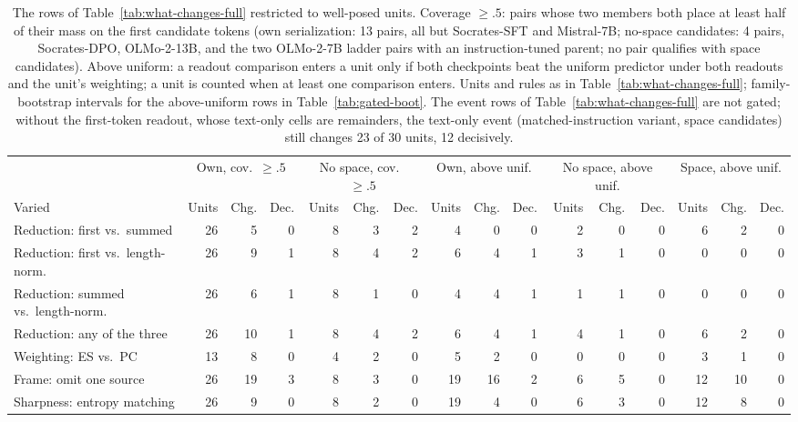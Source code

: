 \begin{table}[t]
\centering\scriptsize
\setlength{\tabcolsep}{2.4pt}
\begin{tabular}{@{}lrrr@{\hspace{5pt}}rrr@{\hspace{5pt}}rrr@{\hspace{5pt}}rrr@{\hspace{5pt}}rrr@{}}
\toprule
& \multicolumn{3}{c}{Own, cov.\ $\ge.5$} & \multicolumn{3}{c}{No space, cov.\ $\ge.5$} & \multicolumn{3}{c}{Own, above unif.} & \multicolumn{3}{c}{No space, above unif.} & \multicolumn{3}{c}{Space, above unif.} \\
\cmidrule(lr){2-4}\cmidrule(lr){5-7}\cmidrule(lr){8-10}\cmidrule(lr){11-13}\cmidrule(l){14-16}
Varied & Units & Chg. & Dec. & Units & Chg. & Dec. & Units & Chg. & Dec. & Units & Chg. & Dec. & Units & Chg. & Dec. \\
\midrule
Reduction: first vs.\ summed & 26 & 5 & 0 & 8 & 3 & 2 & 4 & 0 & 0 & 2 & 0 & 0 & 6 & 2 & 0 \\
Reduction: first vs.\ length-norm. & 26 & 9 & 1 & 8 & 4 & 2 & 6 & 4 & 1 & 3 & 1 & 0 & 0 & 0 & 0 \\
Reduction: summed vs.\ length-norm. & 26 & 6 & 1 & 8 & 1 & 0 & 4 & 4 & 1 & 1 & 1 & 0 & 0 & 0 & 0 \\
Reduction: any of the three & 26 & 10 & 1 & 8 & 4 & 2 & 6 & 4 & 1 & 4 & 1 & 0 & 6 & 2 & 0 \\
Weighting: ES vs.\ PC & 13 & 8 & 0 & 4 & 2 & 0 & 5 & 2 & 0 & 0 & 0 & 0 & 3 & 1 & 0 \\
Frame: omit one source & 26 & 19 & 3 & 8 & 3 & 0 & 19 & 16 & 2 & 6 & 5 & 0 & 12 & 10 & 0 \\
Sharpness: entropy matching & 26 & 9 & 0 & 8 & 2 & 0 & 19 & 4 & 0 & 6 & 3 & 0 & 12 & 8 & 0 \\
\bottomrule
\end{tabular}
\caption{The rows of Table~\ref{tab:what-changes-full} restricted to well-posed units. Coverage $\ge.5$: pairs whose two members both place at least half of their mass on the first candidate tokens (own serialization: 13 pairs, all but Socrates-SFT and Mistral-7B; no-space candidates: 4 pairs, Socrates-DPO, OLMo-2-13B, and the two OLMo-2-7B ladder pairs with an instruction-tuned parent; no pair qualifies with space candidates). Above uniform: a readout comparison enters a unit only if both checkpoints beat the uniform predictor under both readouts and the unit's weighting; a unit is counted when at least one comparison enters. Units and rules as in Table~\ref{tab:what-changes-full}; family-bootstrap intervals for the above-uniform rows in Table~\ref{tab:gated-boot}. The event rows of Table~\ref{tab:what-changes-full} are not gated; without the first-token readout, whose text-only cells are remainders, the text-only event (matched-instruction variant, space candidates) still changes 23 of 30 units, 12 decisively.}
\label{tab:gated}
\end{table}
